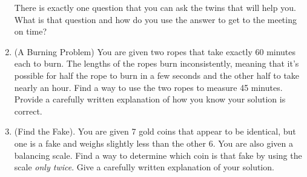 \documentclass[12 pt]{article}
\theoremstyle{definition}
\theoremstyle{plain}
\theoremstyle{mytheorem}
\theoremstyle{myexample}
\theoremstyle{mydefinition}
\begin{document}
\begin{enumerate}
\begin{center}
	\end{center}
	There is exactly one question that you can ask the twins that will help you.  What is that question and how do you use the answer to get to the meeting on time?

\item (A Burning Problem) You are given two ropes that take exactly 60 minutes each to burn.  The lengths of the ropes burn inconsistently, meaning that it's possible for half the rope to burn in a few seconds and the other half to take nearly an hour.  Find a way to use the two ropes to measure 45 minutes.  Provide a carefully written explanation of how you know your solution is correct.

\item (Find the Fake). You are given 7 gold coins that appear to be identical, but one is a fake and weighs slightly less than the other 6.  You are also given a balancing scale.  Find a way to determine which coin is that fake by using the scale \textit{only twice}.  Give a carefully written explanation of your solution.

\end{enumerate}
\end{document}

